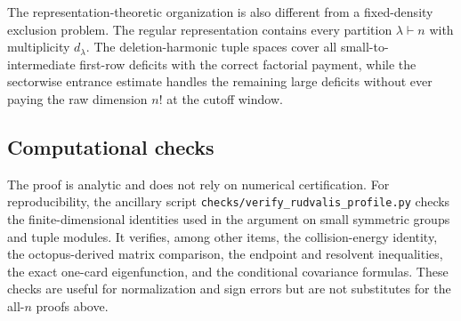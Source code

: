 \documentclass[11pt]{article}
\theoremstyle{remark}
\begin{document}
The representation-theoretic organization is also different from a fixed-density exclusion problem.  The regular representation contains every partition $\lambda\vdash n$ with multiplicity $d_\lambda$.  The deletion-harmonic tuple spaces cover all small-to-intermediate first-row deficits with the correct factorial payment, while the sectorwise entrance estimate handles the remaining large deficits without ever paying the raw dimension $n!$ at the cutoff window.

\subsection{Computational checks}
The proof is analytic and does not rely on numerical certification.  For reproducibility, the ancillary script \texttt{checks/verify\_rudvalis\_profile.py} checks the finite-dimensional identities used in the argument on small symmetric groups and tuple modules.  It verifies, among other items, the collision-energy identity, the octopus-derived matrix comparison, the endpoint and resolvent inequalities, the exact one-card eigenfunction, and the conditional covariance formulas.  These checks are useful for normalization and sign errors but are not substitutes for the all-$n$ proofs above.
\end{document}
